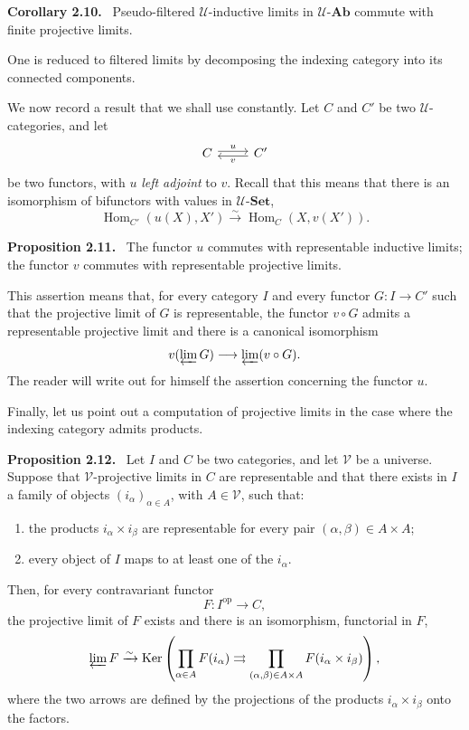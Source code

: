 \documentclass[11pt]{article}
\newcommand{\U}{\mathcal{U}}
\newcommand{\V}{\mathcal{V}}
\newcommand{\Set}{\mathbf{Set}}
\newcommand{\Ab}{\mathbf{Ab}}
\newcommand{\Hom}{\operatorname{Hom}}
\newcommand{\Ker}{\operatorname{Ker}}
\newcommand{\op}{\mathrm{op}}
\newenvironment{statement}[1]{\par\medskip\noindent\textbf{#1.}\ }{\par\medskip}
\begin{document}
\begin{statement}{Corollary 2.10}
Pseudo-filtered $\U$-inductive limits in $\U$-$\Ab$ commute with finite projective limits.
\end{statement}

One is reduced to filtered limits by decomposing the indexing category into its connected components.

We now record a result that we shall use constantly. Let $C$ and $C'$ be two $\U$-categories, and let
\[
\begin{tikzcd}
C\arrow[r,shift left=.45ex,"u"]&C'\arrow[l,shift left=.45ex,"v"]
\end{tikzcd}
\]
be two functors, with $u$ \emph{left adjoint} to $v$. Recall that this means that there is an isomorphism of bifunctors with values in $\U$-$\Set$,
\[
\Hom_{C'}(u(X),X')\xrightarrow{\sim}\Hom_C(X,v(X')).
\]

\begin{statement}{Proposition 2.11}
The functor $u$ commutes with representable inductive limits; the functor $v$ commutes with representable projective limits.
\end{statement}

This assertion means that, for every category $I$ and every functor $G:I\to C'$ such that the projective limit of $G$ is representable, the functor $v\circ G$ admits a representable projective limit and there is a canonical isomorphism
\[
v(\varprojlim G)\longrightarrow \varprojlim(v\circ G).
\]
The reader will write out for himself the assertion concerning the functor $u$.

Finally, let us point out a computation of projective limits in the case where the indexing category admits products.

\begin{statement}{Proposition 2.12}
Let $I$ and $C$ be two categories, and let $\V$ be a universe. Suppose that $\V$-projective limits in $C$ are representable and that there exists in $I$ a family of objects $(i_\alpha)_{\alpha\in A}$, with $A\in\V$, such that:
\begin{enumerate}[label=\arabic*)]
\item the products $i_\alpha\times i_\beta$ are representable for every pair $(\alpha,\beta)\in A\times A$;
\item every object of $I$ maps to at least one of the $i_\alpha$.
\end{enumerate}
Then, for every contravariant functor
\[
F:I^{\op}\longrightarrow C,
\]
the projective limit of $F$ exists and there is an isomorphism, functorial in $F$,
\[
\varprojlim F\xrightarrow{\sim}\Ker\left(\prod_{\alpha\in A}F(i_\alpha)\rightrightarrows \prod_{(\alpha,\beta)\in A\times A}F(i_\alpha\times i_\beta)\right),
\]
where the two arrows are defined by the projections of the products $i_\alpha\times i_\beta$ onto the factors.
\end{statement}
\end{document}
